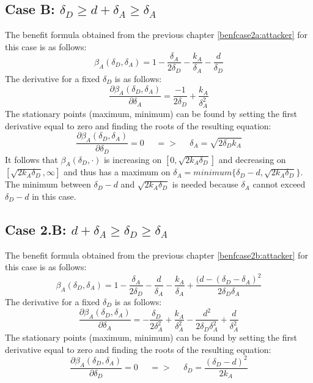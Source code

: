 \subsection*{Case B: $\delta_{D} \geq d+\delta_{A} \geq \delta_{A} $ }
The benefit formula obtained from the previous chapter \ref{benfcase2a:attacker} for this case is as follows:
\begin{equation*}
\beta_{A}(\delta_{D},\delta_{A}) =1- \dfrac{\delta_{A}}{2\delta_{D}} - \dfrac{k_{A}}{\delta_{A}} - \dfrac{d}{\delta_{D}}
\end{equation*}
The derivative for a fixed $\delta_{D}$ is as follows:
\begin{equation*}
\dfrac{\partial \beta_{A}(\delta_{D},\delta_{A})}{\partial \delta_{A}} = \dfrac{-1}{2\delta_{D}} + \dfrac{k_{A}}{\delta_{A}^{2}}
\end{equation*}
The stationary points (maximum, minimum) can be found by setting the first derivative equal to zero and finding the roots of the resulting equation:
\begin{equation*}
\frac{\partial \beta_{A}(\delta_{D},\delta_{A})}{\partial \delta_{D}} =0 ~~~~~~ =>~~~~~~ \delta_{A} = \sqrt{2\delta_{D}k_{A}}
\end{equation*}
It follows that $\beta_{A}(\delta_{D},\cdot)$ is increasing on $[0,\sqrt{2k_{A}\delta_{D}}]$ and decreasing on $[\sqrt{2k_{A}\delta_{D}}, \infty]$ and thus has a maximum on $\delta_{A} = minimum \{\delta_{D} -d, \sqrt{2k_{A}\delta_{D}} \} $. The minimum between $\delta_{D}-d$ and $ \sqrt{2k_{A}\delta_{D}}$ is needed because $\delta_{A} $ cannot exceed $\delta_{D}-d$ in this case. \\

\subsection*{Case 2.B: $d+\delta_{A} \geq \delta_{D} \geq  \delta_{A} $} 

The benefit formula obtained from the previous chapter \ref{benfcase2b:attacker} for this case is as follows: 
\begin{equation*}
\beta_{A}(\delta_{D},\delta_{A}) = 1 - \dfrac{\delta_{A}}{2\delta_{D}} - \dfrac{d}{\delta_{A}} - \dfrac{k_{A}}{\delta_{A}} + \dfrac{(d-(\delta_{D}-\delta_{A})^{2}}{2\delta_{D}\delta_{A}} 
\end{equation*}
The derivative for a fixed $\delta_{D}$ is as follows:
\begin{equation*}
\dfrac{\partial \beta_{A}(\delta_{D},\delta_{A})}{\partial \delta_{A}} = -\dfrac{\delta_{D}}{2\delta_{A}^{2}} + \dfrac{k_{A}}{\delta_{A}^{2}} - \dfrac{d^{2}}{2\delta_{D}\delta_{A}^{2}} + \dfrac{d}{\delta_{A}^{2}}
\end{equation*}
The stationary points (maximum, minimum) can be found by setting the first derivative equal to zero and finding the roots of the resulting equation:
\begin{equation*}
\frac{\partial \beta_{A}(\delta_{D},\delta_{A})}{\partial \delta_{D}} =0 ~~~~~~ =>~~~~~~ \delta_{D}= \dfrac{(\delta_{D}-d)^{2}}{2k_{A}}
\end{equation*}



